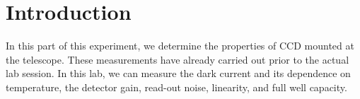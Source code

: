 \section{Introduction}
In this part of this experiment, we determine the properties of CCD mounted at the telescope. These measurements have already carried out prior to the actual lab session. In this lab, we can measure the dark current and its dependence on temperature, the detector gain, read-out noise, linearity, and full well capacity.

